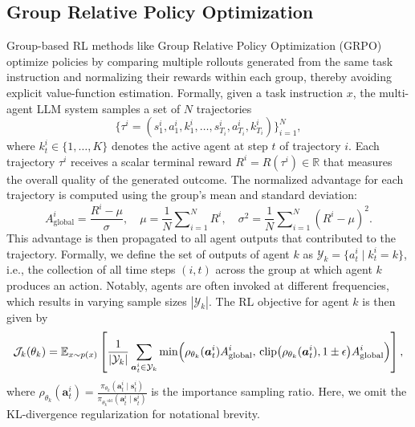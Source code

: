 \documentclass[]{fairmeta}
\theoremstyle{plain}
\theoremstyle{definition}
\theoremstyle{remark}
\begin{document}
\subsection{Group Relative Policy Optimization}
Group-based RL methods like Group Relative Policy Optimization (GRPO)~\citep{shao2024deepseekmath} optimize policies by comparing multiple rollouts generated from the same task instruction and normalizing their rewards within each group, thereby avoiding explicit value-function estimation. 
Formally, given a task instruction $x$, the multi-agent LLM system samples a set of $N$ trajectories
\begin{equation}
    \{\tau^i = (s_1^i, a_1^i, k_1^i, \dots, s_{T_i}^i, a_{T_i}^i, k_{T_i}^i)\}_{i=1}^N,
\end{equation}
where $k_t^i \in \{1,\dots,K\}$ denotes the active agent at step $t$ of trajectory $i$.  
Each trajectory $\tau^i$ receives a scalar terminal reward $R^i = R(\tau^i) \in \mathbb{R}$ that measures the overall quality of the generated outcome. 
The normalized advantage for each trajectory is computed using the group’s mean and standard deviation:
\begin{equation}
    A^i_{\text{global}} = \frac{R^i - \mu}{\sigma}, 
    \quad 
    \mu = \frac{1}{N}\sum\nolimits_{i=1}^N R^i, 
    \quad 
    \sigma^2 = \frac{1}{N}\sum\nolimits_{i=1}^N (R^i - \mu)^2.
\end{equation}
This advantage is then propagated to all agent outputs that contributed to the trajectory. Formally, we define the set of outputs of agent $k$ as $\mathcal{Y}_k = \{a_t^i \mid k_t^i = k\}$, i.e., the collection of all time steps $(i,t)$ across the group at which agent $k$ produces an action. Notably, agents are often invoked at different frequencies, which results in varying sample sizes $|\mathcal{Y}_k|$.
The RL objective for agent $k$ is then given by
\begin{equation}
    \mathcal{J}_k(\theta_k)
    = \mathbb{E}_{x\sim p(x)}\left[
      \frac{1}{|\mathcal{Y}_k|}
      \sum_{\bm{a}_t^i\in \mathcal{Y}_k}
      \min\Bigl(
        \rho_{\theta_k}(\bm{a}_t^{i}) A^i_{\text{global}},
        \,
        \text{clip}\bigl(\rho_{\theta_k}(\bm{a}_t^{i}), 1 \pm \epsilon\bigr) A^i_{\text{global}}
      \Bigr)
    \right],
\end{equation}
where $\rho_{\theta_k}(\bm{a}_t^{i}) = \frac{\pi_{\theta_k}(\bm{a}_t^{i} \mid \bm{s}_t^{i})}{\pi_{{\theta_k}^{\text{old}}}(\bm{a}_t^i \mid \bm{s}_t^i)}$ is the importance sampling ratio. Here, we omit the KL-divergence regularization for notational brevity.
\end{document}

